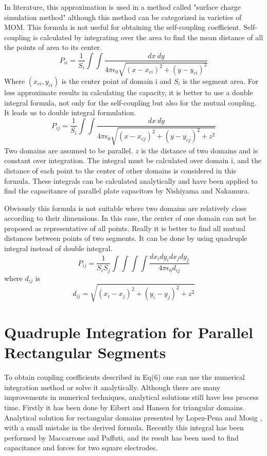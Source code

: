 \documentclass[final,5p,times,twocolumn]{elsarticle}
\begin{document}
In literature, this approximation is used in a method called "surface charge simulation method"\cite {Zhou1993} although this method can be categorized in varieties of MOM. This formula is not useful for obtaining the self-coupling coefficient. Self-coupling is calculated by integrating over the area to find the mean distance of all the points of area to its center.
\begin{equation}
\label{eq4}
P_{ii} = \frac 1 {S_i} \int \int \frac {dx\  dy}{4 \pi \epsilon_0 \sqrt{(x-x_{ci})^2 + (y-y_{ci})^2}}
\end{equation}
Where $(x_{ci}, y_{ci})$ is the center point of domain i and $S_i $ is the segment area.
For less approximate results in calculating the capacity, it is better to use a double integral formula, not only for the self-coupling but also for the mutual coupling. It leads us to double integral formulation.
\begin{equation}
\label{eq5}
P_{ij} = \frac 1 {S_i}\int \int \frac {dx\  dy}{4 \pi \epsilon_0 \sqrt{(x-x_{cj})^2 + (y-y_{cj})^2+ z^2}}
\end{equation}
Two domains are assumed to be parallel. $z$ is the distance of two domains and is constant over integration. The integral must be calculated over domain i, and the distance of each point to the center of other domains is considered in this formula. These integrals can be calculated analytically and have been applied to find the capacitance of parallel plate capacitors by Nishiyama and Nakamura\cite {Nishiyama1994}.

Obviously this formula is not suitable where two domains are relatively close according to their dimensions. In this case, the center of one domain can not be proposed as representative of all points. Really it is better to find all mutual distances between points of two segments. It can be done by using quadruple integral instead of double integral.
\begin{equation}
\label {eq6}
P_{ij} = \frac 1 {S_i S_j}\int \int \int \int \frac{dx_i dy_i dx_j dy_j}{4 \pi \epsilon_0 d_{ij}}
\end{equation} 
where $d _{ij}$ is 
\begin{equation}
\label {eq7}
d_{ij} = \sqrt{(x_i-x_j)^2 + (y_i-y_j)^2 + z^2}
\end{equation} 
\section{Quadruple Integration for Parallel Rectangular Segments}
To obtain coupling coefficients described in Eq(6) one can use the numerical integration method or solve it analytically. Although there are many improvements in numerical techniques, analytical solutions still have less process time. Firstly it has been done by Eibert and Hansen for triangular domains\cite{Eibert1995}. Analytical solution for rectangular domains presented by Lopez-Pena and Mosig \cite{Lopez2009}, with a small mistake in the derived formula. Recently this integral has been performed by Maccarrone and Paffuti\cite{Maccarrone2017}, and its result has been used to find capacitance and forces for two square electrodes.
\end{document}
